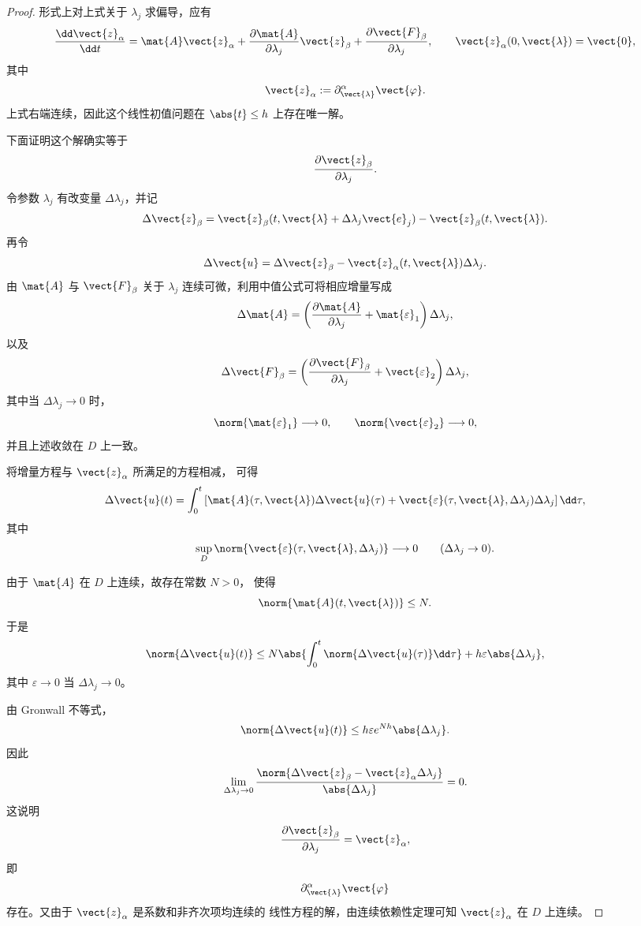 \begin{proof}
	形式上对上式关于 $\lambda_j$ 求偏导，应有
	\[
	\frac{\dd\vect{z}_{\alpha}}{\dd t}
	=
	\mat{A}\vect{z}_{\alpha}
	+
	\frac{\partial\mat{A}}{\partial\lambda_j}
	\vect{z}_{\beta}
	+
	\frac{\partial\vect{F}_{\beta}}{\partial\lambda_j},
	\qquad
	\vect{z}_{\alpha}(0,\vect{\lambda})=\vect{0},
	\]
	其中
	\[
	\vect{z}_{\alpha}
	\mathrel{:=}
	\partial_{\vect{\lambda}}^\alpha
	\vect{\varphi}.
	\]
	上式右端连续，因此这个线性初值问题在
	$\abs{t}\leq h$ 上存在唯一解。
	
	下面证明这个解确实等于
	\[
	\frac{\partial\vect{z}_{\beta}}{\partial\lambda_j}.
	\]
	令参数 $\lambda_j$ 有改变量 $\Delta\lambda_j$，并记
	\[
	\Delta\vect{z}_{\beta}
	=
	\vect{z}_{\beta}
	(t,\vect{\lambda}+\Delta\lambda_j\vect{e}_j)
	-
	\vect{z}_{\beta}(t,\vect{\lambda}).
	\]
	再令
	\[
	\Delta\vect{u}
	=
	\Delta\vect{z}_{\beta}
	-
	\vect{z}_{\alpha}(t,\vect{\lambda})
	\Delta\lambda_j.
	\]
	由 $\mat{A}$ 与 $\vect{F}_{\beta}$ 关于 $\lambda_j$
	连续可微，利用中值公式可将相应增量写成
	\[
	\Delta\mat{A}
	=
	\left(
	\frac{\partial\mat{A}}{\partial\lambda_j}
	+\mat{\varepsilon}_1
	\right)\Delta\lambda_j,
	\]
	以及
	\[
	\Delta\vect{F}_{\beta}
	=
	\left(
	\frac{\partial\vect{F}_{\beta}}{\partial\lambda_j}
	+\vect{\varepsilon}_2
	\right)\Delta\lambda_j,
	\]
	其中当 $\Delta\lambda_j\to0$ 时，
	\[
	\norm{\mat{\varepsilon}_1}\longrightarrow0,
	\qquad
	\norm{\vect{\varepsilon}_2}\longrightarrow0,
	\]
	并且上述收敛在 $D$ 上一致。
	
	将增量方程与 $\vect{z}_{\alpha}$ 所满足的方程相减，
	可得
	\[
	\Delta\vect{u}(t)
	=
	\int_0^t
	\left[
	\mat{A}(\tau,\vect{\lambda})
	\Delta\vect{u}(\tau)
	+
	\vect{\varepsilon}
	(\tau,\vect{\lambda},\Delta\lambda_j)
	\Delta\lambda_j
	\right]\dd\tau,
	\]
	其中
	\[
	\sup_D
	\norm{
		\vect{\varepsilon}
		(\tau,\vect{\lambda},\Delta\lambda_j)
	}
	\longrightarrow0
	\qquad
	(\Delta\lambda_j\to0).
	\]
	
	由于 $\mat{A}$ 在 $D$ 上连续，故存在常数 $N>0$，
	使得
	\[
	\norm{\mat{A}(t,\vect{\lambda})}\leq N.
	\]
	于是
	\[
	\norm{\Delta\vect{u}(t)}
	\leq
	N
	\abs{
		\int_0^t
		\norm{\Delta\vect{u}(\tau)}
		\dd\tau
	}
	+
	h\varepsilon
	\abs{\Delta\lambda_j},
	\]
	其中 $\varepsilon\to0$ 当
	$\Delta\lambda_j\to0$。
	
	由 Gronwall 不等式，
	\[
	\norm{\Delta\vect{u}(t)}
	\leq
	h\varepsilon
	e^{Nh}
	\abs{\Delta\lambda_j}.
	\]
	因此
	\[
	\lim_{\Delta\lambda_j\to0}
	\frac{
		\norm{
			\Delta\vect{z}_{\beta}
			-
			\vect{z}_{\alpha}
			\Delta\lambda_j
		}
	}{
		\abs{\Delta\lambda_j}
	}
	=0.
	\]
	这说明
	\[
	\frac{\partial\vect{z}_{\beta}}{\partial\lambda_j}
	=
	\vect{z}_{\alpha},
	\]
	即
	\[
	\partial_{\vect{\lambda}}^\alpha
	\vect{\varphi}
	\]
	存在。又由于 $\vect{z}_{\alpha}$ 是系数和非齐次项均连续的
	线性方程的解，由连续依赖性定理可知
	$\vect{z}_{\alpha}$ 在 $D$ 上连续。
	

\end{proof}
